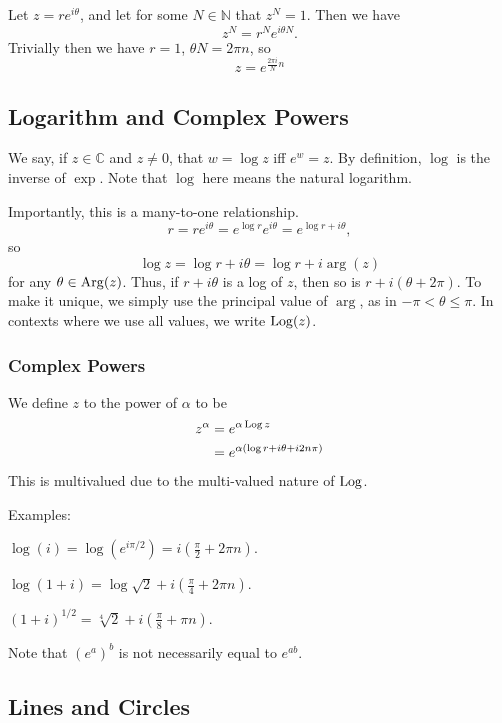 \documentclass[12pt]{article}
\begin{document}
Let $z = re^{i\theta }$, and let for some $N \in \mathbb{N}$ that $z^{N} = 1$.
Then we have
\[
z^{N} = r^{N}e^{i\theta N}.
\]
Trivially then we have $r = 1$, $\theta N= 2\pi n$, so
\[
    z = e^{\frac{2\pi i}{N}n}
\]

\subsection{Logarithm and Complex Powers}

We say, if $z \in \mathbb{C}$ and $z \ne 0$, that $w = \log z$ iff $e^{w} = z$.
By definition, $\log$ is the inverse of $\exp$. 
Note that $\log$ here means the natural logarithm.

Importantly, this is a many-to-one relationship.
\[
r = re^{i\theta } = e^{\log r}e^{i\theta } = e^{\log r + i\theta },
\]
so
\[
\log z = \log r + i\theta  = \log r + i \arg(z)
\]
for any $\theta  \in \operatorname{Arg}(z)$.
Thus, if $r + i\theta $ is a log of $z$, then so is $r + i(\theta + 2\pi)$.
To make it unique, we simply use the principal value of $\arg$,
as in $-\pi < \theta  \le \pi$. 
In contexts where we use all values, we write $\operatorname{Log}(z)$.

\subsubsection*{Complex Powers}

We define $z$ to the power of $\alpha $ to be
\begin{align*}
    z^{\alpha } &= e^{\alpha \operatorname{Log} z}\\
                &= e^{\alpha(\log r + i\theta + i 2n\pi)}
\end{align*}
This is multivalued due to the multi-valued nature of $\operatorname{Log}$.

Examples:
\begin{compactitem}
\item $\log(i) = \log(e^{i\pi / 2}) = i \left(\frac{\pi}{2} + 2\pi n\right)$.
\item $\log(1 + i) = \log\sqrt{2} + i\left(\frac{\pi}{4} + 2\pi n\right)$.
\item $(1 + i)^{1/2} = \sqrt[4]{2} + i\left(\frac{\pi}{8} + \pi n\right)$.
\end{compactitem}

Note that $(e^{a})^{b}$ is not necessarily equal to $e^{ab}$.

\subsection{Lines and Circles}
\end{document}
